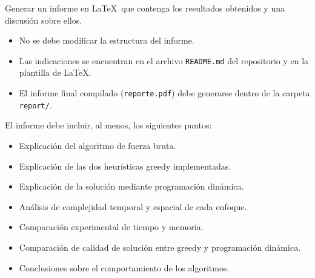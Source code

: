     Generar un informe en \LaTeX\ que contenga los resultados obtenidos y una discusión sobre ellos.

    \begin{itemize}
        \item No se debe modificar la estructura del informe.
        \item Las indicaciones se encuentran en el archivo \texttt{README.md} del repositorio y en la plantilla de \LaTeX.
        \item El informe final compilado (\texttt{reporte.pdf}) debe generarse dentro de la carpeta \texttt{report/}.
    \end{itemize}

    El informe debe incluir, al menos, los siguientes puntos:

    \begin{itemize}
        \item Explicación del algoritmo de fuerza bruta.
        \item Explicación de las dos heurísticas greedy implementadas.
        \item Explicación de la solución mediante programación dinámica.
        \item Análisis de complejidad temporal y espacial de cada enfoque.
        \item Comparación experimental de tiempo y memoria.
        \item Comparación de calidad de solución entre greedy y programación dinámica.
        \item Conclusiones sobre el comportamiento de los algoritmos.
    \end{itemize}